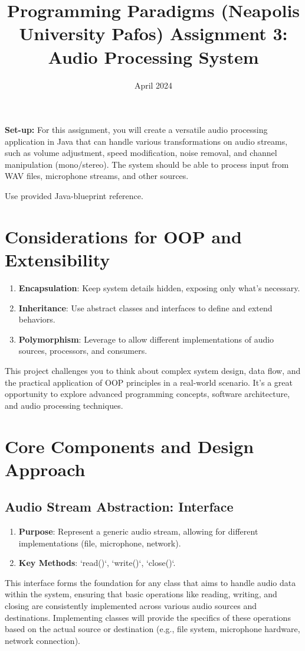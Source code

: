 \documentclass[a4paper,12pt]{article}
\title{Programming Paradigms (Neapolis University Pafos)
  Assignment 3: Audio Processing System}
\date{April 2024}
\begin{document}
\maketitle
\textbf{Set-up:} For this assignment, you will create a versatile audio processing application in Java that can handle various transformations on audio streams, such as volume adjustment, speed modification, noise removal, and channel manipulation (mono/stereo). The system should be able to process input from WAV files, microphone streams, and other sources.

Use provided Java-blueprint reference.

\section{Considerations for OOP and Extensibility}
\begin{enumerate}
  \item \textbf{Encapsulation}: Keep system details hidden, exposing only what's necessary.
  \item \textbf{Inheritance}: Use abstract classes and interfaces to define and extend behaviors.
  \item \textbf{Polymorphism}: Leverage to allow different implementations of audio sources, processors, and consumers.
\end{enumerate}

This project challenges you to think about complex system design,
data flow, and the practical application of OOP principles in a real-world scenario. It's a great opportunity to explore advanced programming concepts, software architecture, and audio processing techniques.

\section{Core Components and Design Approach}
\subsection{Audio Stream Abstraction: Interface}
\begin{enumerate}
    \item \textbf{Purpose}: Represent a generic audio stream, allowing
    for different implementations (file, microphone, network).
    \item \textbf{Key Methods}: `read()`, `write()`, `close()`.
\end{enumerate}
This interface forms the foundation for any class that aims to handle audio data within the system,
ensuring that basic operations like reading, writing, and closing are consistently implemented across various audio sources and destinations.
Implementing classes will provide the specifics of these operations based on the actual source or destination (e.g., file system, microphone hardware, network connection).
\end{document}
